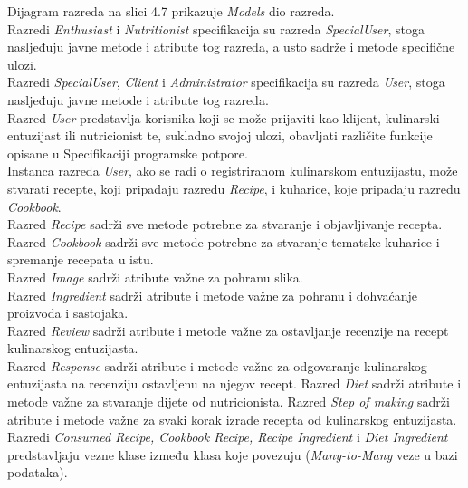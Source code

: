 Dijagram razreda na slici 4.7 prikazuje \textit{Models} dio razreda. \\
	Razredi \textit{Enthusiast} i \textit{Nutritionist} specifikacija su razreda \textit{SpecialUser}, stoga nasljeđuju javne metode i atribute tog razreda, a usto sadrže i metode specifične ulozi. \\
	Razredi \textit{SpecialUser}, \textit{Client} i \textit{Administrator} specifikacija su razreda \textit{User}, stoga nasljeđuju javne metode i atribute tog razreda. \\
	Razred \textit{User} predstavlja korisnika koji se može prijaviti kao klijent, kulinarski entuzijast ili nutricionist te, sukladno svojoj ulozi, obavljati različite funkcije opisane u Specifikaciji programske potpore. \\
    Instanca razreda \textit{User}, ako se radi o registriranom kulinarskom entuzijastu, može stvarati recepte, koji pripadaju razredu \textit{Recipe}, i kuharice, koje pripadaju razredu \textit{Cookbook}. \\
    Razred \textit{Recipe} sadrži sve metode potrebne za stvaranje i objavljivanje recepta. \\
    Razred \textit{Cookbook} sadrži sve metode potrebne za stvaranje tematske kuharice i spremanje recepata u istu. \\
    Razred \textit{Image} sadrži atribute važne za pohranu slika. \\
    Razred \textit{Ingredient} sadrži atribute i metode važne za pohranu i dohvaćanje proizvoda i sastojaka. \\
    Razred \textit{Review} sadrži atribute i metode važne za ostavljanje recenzije na recept kulinarskog entuzijasta. \\
    Razred \textit{Response} sadrži atribute i metode važne za odgovaranje kulinarskog entuzijasta na recenziju ostavljenu na njegov recept.
    Razred \textit{Diet} sadrži atribute i metode važne za stvaranje dijete od nutricionista. 
    Razred \textit{Step of making} sadrži atribute i metode važne za svaki korak izrade recepta od kulinarskog entuzijasta.
    Razredi \textit{Consumed Recipe, Cookbook Recipe, Recipe Ingredient} i \textit{Diet Ingredient} predstavljaju vezne klase između klasa koje povezuju (\textit{Many-to-Many} veze u bazi podataka).
			
